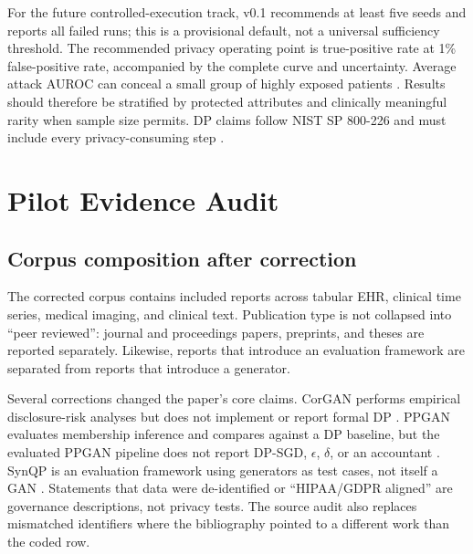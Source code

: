 \documentclass[11pt,letterpaper]{article}
\begin{document}
For the future controlled-execution track, v0.1 recommends at least five seeds and reports all failed runs; this is a provisional default, not a universal sufficiency threshold. The recommended privacy operating point is true-positive rate at 1\% false-positive rate, accompanied by the complete curve and uncertainty. Average attack AUROC can conceal a small group of highly exposed patients \citep{carlini2022membership}. Results should therefore be stratified by protected attributes and clinically meaningful rarity when sample size permits. DP claims follow NIST SP 800-226 and must include every privacy-consuming step \citep{near2025nist}.

\section{Pilot Evidence Audit}
\label{sec:results}

\subsection{Corpus composition after correction}

The corrected corpus contains \CorpusN{} included reports across tabular EHR, clinical time series, medical imaging, and clinical text. Publication type is not collapsed into ``peer reviewed'': journal and proceedings papers, preprints, and theses are reported separately. Likewise, reports that introduce an evaluation framework are separated from reports that introduce a generator.

Several corrections changed the paper's core claims. CorGAN performs empirical disclosure-risk analyses but does not implement or report formal DP \citep{torfi2020corgan}. PPGAN evaluates membership inference and compares against a DP baseline, but the evaluated PPGAN pipeline does not report DP-SGD, $\epsilon$, $\delta$, or an accountant \citep{ashrafi2023ppgan}. SynQP is an evaluation framework using generators as test cases, not itself a GAN \citep{hu2025synqp}. Statements that data were de-identified or ``HIPAA/GDPR aligned'' are governance descriptions, not privacy tests. The source audit also replaces mismatched identifiers where the bibliography pointed to a different work than the coded row.

\begin{table}[t]
\centering
\caption{Headline evidence counts, generated directly from the corrected annotation file.}
\label{tab:headlines}

\end{table}
\end{document}
